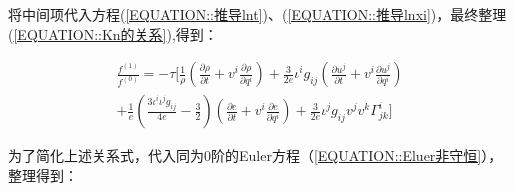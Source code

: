 \documentclass[LBMDerivation.tex]{subfiles}
\begin{document}
将中间项代入方程(\ref{EQUATION::推导lnt})、(\ref{EQUATION::推导lnxi})，最终整理(\ref{EQUATION::Kn的关系}),得到：






\begin{equation}
  \begin{gathered}
    \frac{f^{(1)}}{f^{(0)}}=
    -\tau [\frac{1}{\rho}(\frac{\partial \rho}{\partial t} + v^{i}\frac{\partial \rho}{\partial q^i}) + \frac{3}{2e}\iota^i g_{ij} (\frac{\partial u^j}{\partial t}+ v^i \frac{\partial u^j}{\partial q^i}) \\
      + \frac{1}{e} (\frac{3 {\iota^i\iota^jg_{ij}}}{4e}-\frac{3}{2}) (\frac{\partial e}{\partial t} + v^i \frac{\partial e}{\partial q^i}) + \frac{3}{2e}\iota^j g_{ij} v^{j} v^{k} \Gamma_{j k}^{i}   ]
  \end{gathered}
\end{equation}




为了简化上述关系式，代入同为0阶的Euler方程（\ref{EQUATION::Eluer非守恒}），整理得到：
\end{document}
